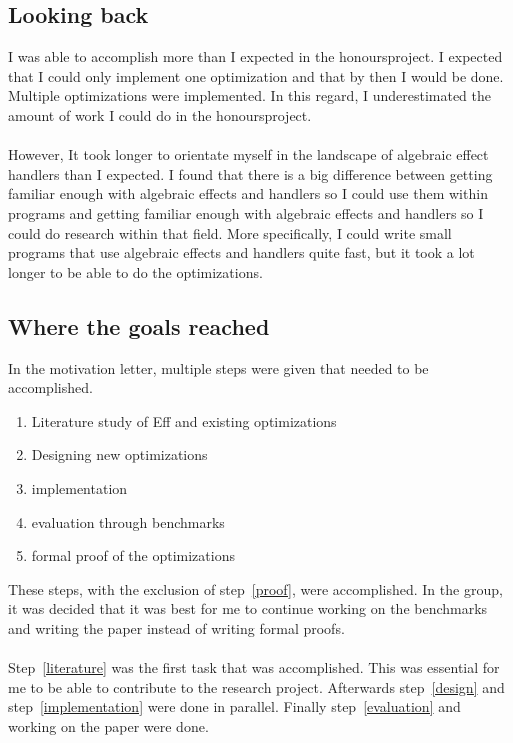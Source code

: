 \subsection{Looking back}
I was able to accomplish more than I expected in the honoursproject. I expected that I could only implement one optimization and that by then I would be done. Multiple optimizations were implemented. In this regard, I underestimated the amount of work I could do in the honoursproject. \\
\\
However, It took longer to orientate myself in the landscape of algebraic effect handlers than I expected. I found that there is a big difference between getting familiar enough with algebraic effects and handlers so I could use them within programs and getting familiar enough with algebraic effects and handlers so I could do research within that field. More specifically, I could write small programs that use algebraic effects and handlers quite fast, but it took a lot longer to be able to do the optimizations. 

\subsection{Where the goals reached}
In the motivation letter, multiple steps were given that needed to be accomplished.
\begin{enumerate}
\item Literature study of Eff and existing optimizations \label{literature}
\item Designing new optimizations \label{design}
\item implementation \label{implementation}
\item evaluation through benchmarks \label{evaluation}
\item formal proof of the optimizations \label{proof}
\end{enumerate}
These steps, with the exclusion of step~\ref{proof}, were accomplished. In the group, it was decided that it was best for me to continue working on the benchmarks and writing the paper instead of writing formal proofs. \\
\\
Step~\ref{literature} was the first task that was accomplished. This was essential for me to be able to contribute to the research project. Afterwards step~\ref{design} and step~\ref{implementation} were done in parallel. Finally step~\ref{evaluation} and working on the paper were done. 

